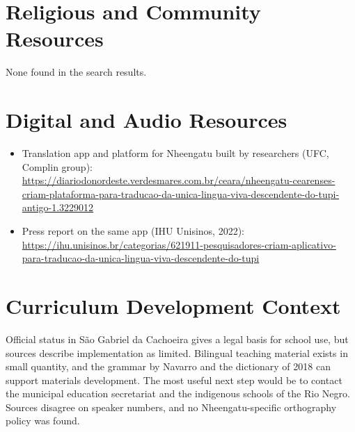 \documentclass[12pt]{article}
\begin{document}
\section{Religious and Community Resources}
None found in the search results.

\section{Digital and Audio Resources}
\begin{itemize}
\item Translation app and platform for Nheengatu built by researchers (UFC, Complin group): \url{https://diariodonordeste.verdesmares.com.br/ceara/nheengatu-cearenses-criam-plataforma-para-traducao-da-unica-lingua-viva-descendente-do-tupi-antigo-1.3229012}
\item Press report on the same app (IHU Unisinos, 2022): \url{https://ihu.unisinos.br/categorias/621911-pesquisadores-criam-aplicativo-para-traducao-da-unica-lingua-viva-descendente-do-tupi}
\end{itemize}

\section{Curriculum Development Context}
Official status in S\~ao Gabriel da Cachoeira gives a legal basis for school use, but sources describe implementation as limited. Bilingual teaching material exists in small quantity, and the grammar by Navarro and the dictionary of 2018 can support materials development. The most useful next step would be to contact the municipal education secretariat and the indigenous schools of the Rio Negro. Sources disagree on speaker numbers, and no Nheengatu-specific orthography policy was found.
\end{document}
